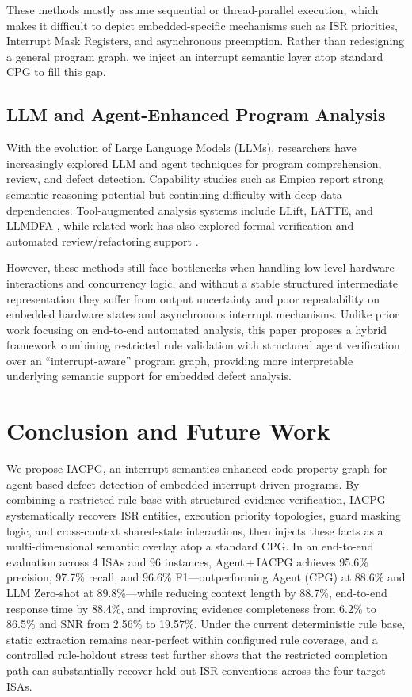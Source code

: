 \documentclass[a4paper,UKenglish,cleveref, autoref, thm-restate]{lipics-v2021}
\begin{document}
These methods mostly assume sequential or thread-parallel execution, which makes it difficult to depict embedded-specific mechanisms such as ISR priorities, Interrupt Mask Registers, and asynchronous preemption. Rather than redesigning a general program graph, we inject an interrupt semantic layer atop standard CPG to fill this gap.

\subsection{LLM and Agent-Enhanced Program Analysis}

With the evolution of Large Language Models (LLMs), researchers have increasingly explored LLM and agent techniques for program comprehension, review, and defect detection. Capability studies such as Empica \cite{nguyen2025empirical} report strong semantic reasoning potential but continuing difficulty with deep data dependencies. Tool-augmented analysis systems include LLift, LATTE, and LLMDFA \cite{li2024enhancing, liu2025llm, wang2024llmdfa}, while related work has also explored formal verification and automated review/refactoring support \cite{ma2026integrating, yu2024fine, li2025codedoctor, nashaat2024towards}.

However, these methods still face bottlenecks when handling low-level hardware interactions and concurrency logic, and without a stable structured intermediate representation they suffer from output uncertainty and poor repeatability on embedded hardware states and asynchronous interrupt mechanisms. Unlike prior work focusing on end-to-end automated analysis, this paper proposes a hybrid framework combining restricted rule validation with structured agent verification over an ``interrupt-aware'' program graph, providing more interpretable underlying semantic support for embedded defect analysis.


\section{Conclusion and Future Work}

We propose IACPG, an interrupt-semantics-enhanced code property graph for agent-based defect detection of embedded interrupt-driven programs. By combining a restricted rule base with structured evidence verification, IACPG systematically recovers ISR entities, execution priority topologies, guard masking logic, and cross-context shared-state interactions, then injects these facts as a multi-dimensional semantic overlay atop a standard CPG. In an end-to-end evaluation across 4 ISAs and 96 instances, Agent\,+\,IACPG achieves 95.6\% precision, 97.7\% recall, and 96.6\% F1—outperforming Agent (CPG) at 88.6\% and LLM Zero-shot at 89.8\%—while reducing context length by 88.7\%, end-to-end response time by 88.4\%, and improving evidence completeness from 6.2\% to 86.5\% and SNR from 2.56\% to 19.57\%. Under the current deterministic rule base, static extraction remains near-perfect within configured rule coverage, and a controlled rule-holdout stress test further shows that the restricted completion path can substantially recover held-out ISR conventions across the four target ISAs.
\end{document}
